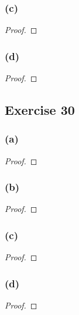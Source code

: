 \documentclass[14pt]{extarticle}
\begin{document}
\subsubsection{(c)}

\begin{proof}

\end{proof}

\subsubsection{(d)}

\begin{proof}

\end{proof}

\subsection{Exercise 30}

\subsubsection{(a)}

\begin{proof}

\end{proof}

\subsubsection{(b)}

\begin{proof}

\end{proof}

\subsubsection{(c)}

\begin{proof}

\end{proof}

\subsubsection{(d)}

\begin{proof}

\end{proof}
\end{document}
